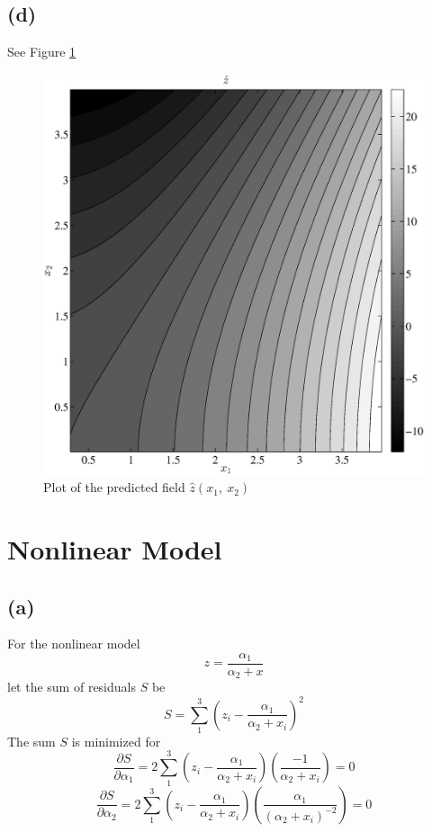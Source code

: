 \documentclass[fleqn, letterpaper]{tufte-handout}
\begin{document}
\subsection{(d)} See Figure \ref{exprnd}
\begin{figure}
        \includegraphics[width=\textwidth]{problem1d}
        \caption{Plot of the predicted field $\hat{z}(x_1,\ x_2)$}
        \label{exprnd}
\end{figure}
\section{Nonlinear Model}
\subsection{(a)}
For the nonlinear model
\[z=\frac{\alpha_1}{\alpha_2 + x}
\]
let the sum of residuals $S$ be
\[S=\sum_1^3\left(z_i-\frac{\alpha_1}{\alpha_2 + x_i}\right)^2
\]
The sum $S$ is minimized for
\[
        \frac{\partial S}{\partial \alpha_1} = 2\sum_1^3\left(z_i-\frac{\alpha_1}{\alpha_2 + x_i}\right)
        \left(\frac{-1}{\alpha_2 + x_i}\right) = 0
\]
\[
        \frac{\partial S}{\partial \alpha_2} = 2\sum_1^3\left(z_i-\frac{\alpha_1}{\alpha_2 + x_i}\right)
        \left(\frac{\alpha_1}{(\alpha_2 + x_i)^{-2}}\right) = 0
\]
\end{document}
